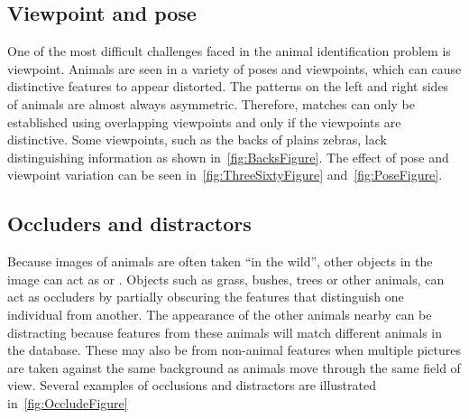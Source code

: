         \PlainsFigure{}

        \HardCaseFigure{}

        \GirMasaiFigure{}

        \GrevysFigure{}

        \HumpbackFig{}

    \subsection{Viewpoint and pose}
        One of the most difficult challenges faced in the animal identification problem is viewpoint. Animals are seen
        in a variety of poses and viewpoints, which can cause distinctive features to appear distorted. The patterns on
        the left and right sides of animals are almost always asymmetric. Therefore, matches can only be established
        using overlapping viewpoints and only if the viewpoints are distinctive. Some viewpoints, such as the backs of
        plains zebras, lack distinguishing information as shown in~\cref{fig:BacksFigure}. The effect of pose and
        viewpoint variation can be seen in~\cref{fig:ThreeSixtyFigure} and~\cref{fig:PoseFigure}.

        \BacksFigure{}

        \ThreeSixtyFigure{}

        \PoseFigure{}

    \subsection{Occluders and distractors}
        Because images of animals are often taken ``in the wild'', other objects in the image can act as
         or . Objects such as grass, bushes, trees or other animals, can act
        as occluders by partially obscuring the features that distinguish one individual from another. The appearance of
        the other animals nearby can be distracting because features from these animals will match different animals in
        the database. These  may also be from non-animal features when multiple pictures are
        taken against the same background as animals move through the same field of view. Several examples of occlusions
        and distractors are illustrated in~\cref{fig:OccludeFigure}

        \OccludeFigure{}

